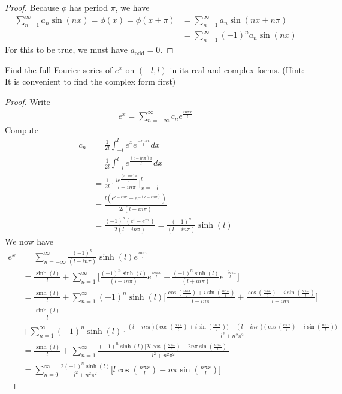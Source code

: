 \documentclass{report}
\begin{document}
\begin{proof}
Because $\phi$ has period $\pi $, we have 
\begin{align*}
\sum_{n=1}^{\infty} a_n \sin (nx)= \phi (x)= \phi (x+ \pi )&= \sum_{n=1}^{\infty}a_n \sin (nx+ n \pi )\\
&=\sum_{n=1}^{\infty}(-1)^na_n \sin (nx)
\end{align*}
For this to be true, we must have $a_{\operatorname{odd}}=0$. 
\end{proof}
\begin{question}{}{}
Find the full Fourier series of $e^x$ on  $(-l,l)$ in its real and complex forms. (Hint: It is convenient to find the complex form first)
\end{question}
\begin{proof}
Write 
\begin{align*}
e^x= \sum_{n=- \infty}^{\infty} c_n e^{ \frac{i n \pi x }{l}}
\end{align*}
Compute 
\begin{align*}
c_n&= \frac{1}{2l}\int_{-l}^{l}e^x e^{\frac{- i n \pi  x}{l}}dx \\
&=\frac{1}{2l}\int_{-l}^{l}e^{ \frac{(l-i n\pi )x}{l}}dx\\
&=\frac{1}{2l} \cdot \frac{le^{\frac{(l-i n \pi )x}{l}}}{l-i n \pi  }\Big|_{x=-l}^{l} \\
&= \frac{l(e^{l- i n \pi }- e^{-(l- i n \pi )})}{2l (l- i n \pi )}\\
&= \frac{(-1)^n (e^l - e^{-l})}{2(l - i n \pi )}= \frac{(-1)^n}{(l- i n \pi )}\sinh (l)
\end{align*}
We now have 
\begin{align*}
e^x&= \sum_{n=-\infty}^{\infty} \frac{(-1)^n}{(l- i n \pi )}\sinh (l) e^{\frac{i n \pi x}{l}} \\
&= \frac{\sinh (l)}{l}+ \sum_{n=1}^{\infty} \Big[\frac{(-1)^n \sinh (l) }{(l- i n \pi )}e^{\frac{i n \pi  x}{l}}+ \frac{(-1)^n \sinh (l)}{(l+ i n \pi )}e^{\frac{- i n \pi x}{l}}  \Big] \\
&=\frac{\sinh (l)}{l}+ \sum_{n=1}^{\infty} (-1)^n\sinh (l) \Big[ \frac{\cos (\frac{n \pi  x}{l})+ i \sin (\frac{n \pi  x}{l})}{l- i n \pi }+ \frac{\cos (\frac{n \pi  x}{l})- i \sin (\frac{n \pi  x}{l})}{l+ i n \pi } \Big]\\
&= \frac{\sinh (l)}{l}\\
&+ \sum_{n=1}^{\infty} (-1)^n \sinh (l) \cdot \frac{(l+ i n \pi )\big(\cos (\frac{n \pi  x}{l})+i \sin (\frac{n \pi  x}{l})  \big)+(l- i n \pi )\big( \cos (\frac{n \pi  x}{l})- i \sin (\frac{n \pi  x}{l}) \big)}{l^2 + n^2 \pi ^2} \\
&=\frac{\sinh (l)}{l}+ \sum_{n=1}^{\infty} \frac{(-1)^n \sinh (l)\big[ 2l \cos (\frac{n \pi  x}{l})-2n \pi  \sin (\frac{n \pi  x}{l}) \big]}{l^2+n^2\pi  ^2} \\
&= \sum_{n=0}^{\infty} \frac{2(-1)^n \sinh (l)}{l^2 + n^2 \pi ^2}\Big[l\cos (\frac{n \pi  x}{l})- n \pi  \sin (\frac{n \pi  x}{l}) \Big]
\end{align*}

\end{proof}
\end{document}
